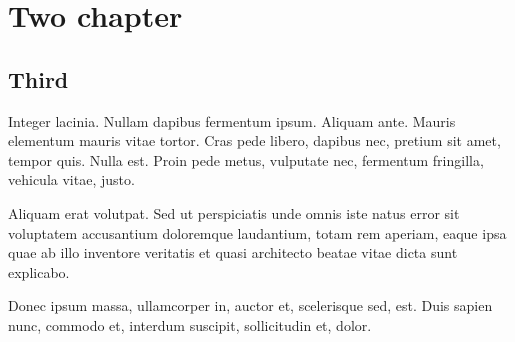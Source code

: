\chapter{Two chapter}
\section{Third}
Integer lacinia. Nullam dapibus fermentum ipsum. Aliquam ante. Mauris elementum mauris vitae tortor. Cras pede libero, dapibus nec, pretium sit amet, tempor quis. Nulla est. Proin pede metus, vulputate nec, fermentum fringilla, vehicula vitae, justo.

Aliquam erat volutpat. Sed ut perspiciatis unde omnis iste natus error sit voluptatem accusantium doloremque laudantium, totam rem aperiam, eaque ipsa quae ab illo inventore veritatis et quasi architecto beatae vitae dicta sunt explicabo.

Donec ipsum massa, ullamcorper in, auctor et, scelerisque sed, est. Duis sapien nunc, commodo et, interdum suscipit, sollicitudin et, dolor.
